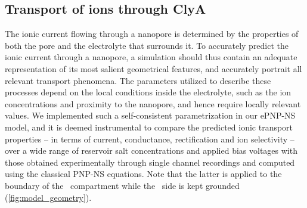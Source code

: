 \documentclass[journal=ancac3,manuscript=article,etalmode=truncate,maxauthors=0,layout=twocolumn]{achemso}
\begin{document}
\subsection{Transport of ions through ClyA}\label{sect:ion_transport}
The ionic current flowing through a nanopore is determined by the properties of both the pore and the 
electrolyte that surrounds it. To accurately predict the ionic current through a nanopore, a simulation 
should thus contain an adequate representation of its most salient geometrical features, and accurately 
portrait all relevant transport phenomena. The parameters utilized to describe these processes depend on the 
local conditions inside the electrolyte, such as the ion concentrations and proximity to the nanopore, and 
hence require locally relevant values. We implemented such a self-consistent parametrization in our ePNP-NS 
model, and it is deemed instrumental to compare the predicted ionic transport properties -- in terms of 
current, conductance, rectification and ion selectivity -- over a wide range of reservoir salt concentrations 
and applied bias voltages with those obtained experimentally through single channel recordings and computed 
using the classical PNP-NS equations. Note that the latter is applied to the boundary of the \trans\ 
compartment while the \cis\ side is kept grounded (\cref{fig:model_geometry}).

\end{document}
